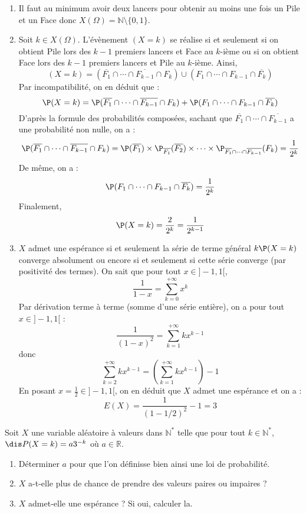 \documentclass[a4paper,10pt]{report}
\begin{document}
\begin{enumerate}
\item Il faut au minimum avoir deux lancers pour obtenir au moins une fois un Pile et un Face donc $X(\Omega)= \mathbb{N} \setminus \lbrace 0,1 \rbrace$.
\item Soit $k \in X(\Omega)$. L'évènement $(X=k)$ se réalise si et seulement si on obtient Pile lors des $k-1$ premiers lancers et Face au $k$-ième ou si on obtient Face lors des $k-1$ premiers lancers et Pile au $k$-ième. Ainsi,
$$ (X=k) = (\overline{F_1} \cap \cdots \cap \overline{F_{k-1}} \cap F_k) \cup      (F_1 \cap \cdots \cap F_{k-1} \cap \overline{F_k} )$$
Par incompatibilité, on en déduit que :
$$ \P(X=k) = \P(\overline{F_1} \cap \cdots \cap \overline{F_{k-1}} \cap F_k) +     \P(F_1 \cap \cdots \cap F_{k-1} \cap \overline{F_k} )$$
D'après la formule des probabilités composées, sachant que $\overline{F_1} \cap \cdots \cap \overline{F_{k-1}}$ a une probabilité non nulle, on a :
$$ \P(\overline{F_1} \cap \cdots \cap \overline{F_{k-1}} \cap F_k) = \P(\overline{F_1}) \times \P_{\overline{F_1}}(\overline{F_2}) \times \cdots \times \P_{\overline{F_1} \cap \cdots \cap \overline{F_{k-1}}}(F_k) = \dfrac{1}{2^k}$$
De même, on a :
$$ \P(F_1 \cap \cdots \cap F_{k-1} \cap \overline{F_k} ) = \dfrac{1}{2^k}$$
Finalement,
$$ \P(X=k) = \dfrac{2}{2^k} = \dfrac{1}{2^{k-1}}$$
\item $X$ admet une espérance si et seulement la série de terme général $k\P(X=k)$ converge absolument ou encore si et seulement si cette série converge (par positivité des termes). On sait que pour tout $x \in ]-1,1[$,
$$ \dfrac{1}{1-x} = \sum_{k=0}^{+ \infty} x^k$$
Par dérivation terme à terme (somme d'une série entière), on a pour tout $x \in ]-1,1[$ :
$$ \dfrac{1}{(1-x)^2} = \sum_{k=1}^{+ \infty} k x^{k-1}$$
donc
$$ \sum_{k=2}^{+ \infty} k x^{k-1} = \left(\sum_{k=1}^{+ \infty} k x^{k-1}\right) -1$$
En posant $x= \tfrac{1}{2} \in ]-1,1[$, on en déduit que $X$ admet une espérance et on a :
$$ E(X) = \dfrac{1}{(1- 1/2)^2} -1= 3$$
\end{enumerate}

\begin{Exa}
 Soit $X$ une variable aléatoire à valeurs dans $\mathbb{N}^*$ telle que pour tout $k \in \mathbb{N}^*$, $\dis P(X=k)=a3^{-k}$ où $a \in \mathbb{R}$.
\begin{enumerate}
\item Déterminer $a$ pour que l'on définisse bien ainsi une loi de probabilité.
\item $X$ a-t-elle plus de chance de prendre des valeurs paires ou impaires ?
\item $X$ admet-elle une espérance ? Si oui, calculer la.
\end{enumerate}
\end{Exa}
\end{document}
